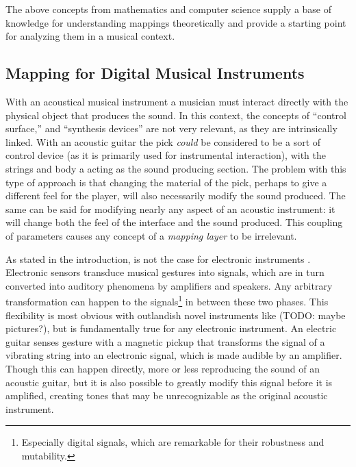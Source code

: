 The above concepts from mathematics and computer science supply a base of knowledge for understanding mappings theoretically and provide a starting point for analyzing them in a musical context.

	\subsection{Mapping for Digital Musical Instruments} \label{sec:mappingforDMIs}

With an acoustical musical instrument a musician must interact directly with the physical object that produces the sound. In this context, the concepts of ``control surface,'' and ``synthesis devices'' are not very relevant, as they are intrinsically linked. With an acoustic guitar the pick \emph{could} be considered to be a sort of control device (as it is primarily used for instrumental interaction), with the strings and body a acting as the sound producing section. The problem with this type of approach is that changing the material of the pick, perhaps to give a different feel for the player, will also necessarily modify the sound produced. The same can be said for modifying nearly any aspect of an acoustic instrument: it will change both the feel of the interface and the sound produced. This coupling of parameters causes any concept of a \emph{mapping layer} to be irrelevant.

As stated in the introduction, is not the case for electronic instruments . Electronic sensors transduce musical gestures into signals, which are in turn converted into auditory phenomena by amplifiers and speakers. Any arbitrary transformation can happen to the signals\footnote{Especially digital signals, which are remarkable for their robustness and mutability.} in between these two phases. This flexibility is most obvious with outlandish novel instruments like (TODO: maybe pictures?), but is fundamentally true for any electronic instrument. An electric guitar senses gesture with a magnetic pickup that transforms the signal of a vibrating string into an electronic signal, which is made audible by an amplifier. Though this can happen directly, more or less reproducing the sound of an acoustic guitar, but it is also possible to greatly modify this signal before it is amplified, creating tones that may be unrecognizable as the original acoustic instrument.

